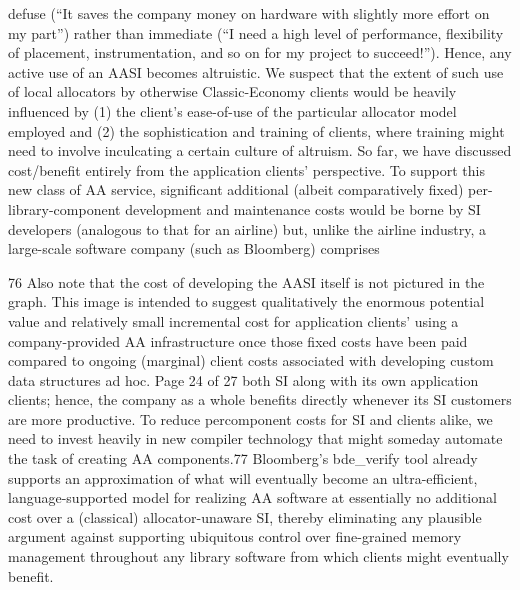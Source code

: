 defuse (“It saves the company money on hardware with slightly more effort on my
part”) rather than immediate (“I need a high level of performance, flexibility of
placement, instrumentation, and so on for my project to succeed!”). Hence, any
active use of an AASI becomes altruistic. We suspect that the extent of such use of
local allocators by otherwise Classic-Economy clients would be heavily influenced by
(1) the client’s ease-of-use of the particular allocator model employed and (2) the
sophistication and training of clients, where training might need to involve
inculcating a certain culture of altruism.
So far, we have discussed cost/benefit entirely from the application clients’
perspective. To support this new class of AA service, significant additional (albeit
comparatively fixed) per-library-component development and maintenance costs
would be borne by SI developers (analogous to that for an airline) but, unlike the
airline industry, a large-scale software company (such as Bloomberg) comprises

76 Also note that the cost of developing the AASI itself is not pictured in the graph. This image is
intended to suggest qualitatively the enormous potential value and relatively small incremental cost
for application clients’ using a company-provided AA infrastructure once those fixed costs have been
paid compared to ongoing (marginal) client costs associated with developing custom data structures
ad hoc.
Page 24 of 27
both SI along with its own application clients; hence, the company as a whole
benefits directly whenever its SI customers are more productive. To reduce percomponent costs for SI and clients alike, we need to invest heavily in new compiler
technology that might someday automate the task of creating AA components.77
Bloomberg’s bde_verify tool already supports an approximation of what will
eventually become an ultra-efficient, language-supported model for realizing AA
software at essentially no additional cost over a (classical) allocator-unaware SI,
thereby eliminating any plausible argument against supporting ubiquitous control
over fine-grained memory management throughout any library software from which
clients might eventually benefit.

